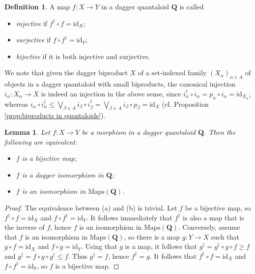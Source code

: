\documentclass[12pt]{tac}
\newtheorem{lemma}[theorem]{Lemma}
\theoremstyle{definition}
\newtheorem{definition}[theorem]{Definition}
\theoremstyle{remark}
\newcommand{\<}{\langle}
\renewcommand{\>}{\rangle}
\renewcommand{\:}{\colon}
\newcommand{\id}{\mathrm{id}}
\begin{document}
\begin{definition}
A map $f:X\to Y$ in a dagger quantaloid $\mathbf Q$ is called
\begin{itemize}
        \item \emph{injective} if $f^\dag\circ f=\id_X$;
        \item \emph{surjective} if $f\circ f^\dag=\id_Y$;
        \item \emph{bijective} if it is both injective and surjective.
    \end{itemize}
\end{definition}
We note that given the dagger biproduct $X$ of a set-indexed family $(X_\alpha)_{\alpha\in A}$ of objects in a dagger quantaloid with small biproducts, the canonical injection $i_\alpha:X_\alpha\to X$ is indeed an injection in the above sense, since $i_\alpha^\dag\circ i_\alpha=p_\alpha\circ i_\alpha=\id_{X_\alpha}$, whereas $i_\alpha\circ i_\alpha^\dag\leq\bigvee_{\beta\in A}i_\beta\circ i_\beta^\dag=\bigvee_{\beta\in A}i_\beta\circ p_\beta=\id_X$ (cf. Proposition \ref{prop:biproducts in quantaloids}). 

\begin{lemma}\label{lem:bijective function vs dagger iso}
Let $f:X\to Y$ be a morphism in a dagger quantaloid $\mathbf Q$. Then the following are equivalent:
\begin{itemize}
    \item[(a)] $f$ is a bijective map;
    \item[(b)] $f$ is a dagger isomorphism in $\mathbf Q$;
    \item[(c)] $f$ is an isomorphism in $\mathrm{Maps}(\mathbf Q)$.
\end{itemize}
\end{lemma}
\begin{proof}
    The equivalence between (a) and (b) is trivial. Let $f$ be a bijective map, so $f^\dag\circ f=\id_X$ and $f\circ f^\dag=\id_Y$. It follows immediately that $f^\dag$ is also a map that is the inverse of $f$, hence $f$ is an isomorphism in $\mathrm{Maps}(\mathbf Q)$. Conversely, assume that $f$ is an isomorphism in $\mathrm{Maps}(\mathbf Q)$, so there is a map $g:Y\to X$ such that $g\circ f=\id_X$ and $f\circ g=\id_Y$. 
    Using that $g$ is a map, it follows that
$g^\dag=g^\dag\circ g\circ f\geq f$ and $g^\dag=f\circ g\circ g^\dag\leq f$. Thus $g^\dag=f$, hence $f^\dag=g$. It follows that $f^\dag\circ f=\id_X$ and $f\circ f^\dag=\id_Y$, so $f$ is a bijective map.
\end{proof}
\end{document}
